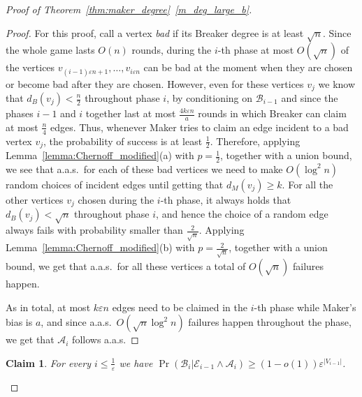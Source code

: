 \documentclass[11pt, a4paper]{article}
\numberwithin{equation}{section}
\numberwithin{figure}{section}
\newtheorem{claim}[theorem]{Claim}
\begin{document}
\begin{proof}[Proof of Theorem~\ref{thm:maker_degree}~\ref{m_deg_large_b}]
\begin{proof}
For this proof, call a vertex \textit{bad} if its Breaker degree is at least $\sqrt{n}$.
Since the whole game lasts $O(n)$ rounds,
during the $i$-th phase at most $O(\sqrt{n})$ of the vertices $v_{(i-1)\varepsilon n +1},\ldots,v_{i \varepsilon n}$ can be bad at the moment when they are chosen or become bad after they are chosen.
However, even for these vertices $v_j$ we know that
$d_B(v_j)< \frac{n}{2}$ throughout phase $i$,
by conditioning on $\mathcal{B}_{i-1}$ and since the phases
$i-1$ and $i$ together 
last at most $\frac{4k\varepsilon n}{a}$ rounds in which
Breaker can claim at most $\frac{n}{4}$ edges. Thus, whenever Maker tries to claim an edge incident to a bad vertex $v_j$,
the probability of success is at least $\frac{1}{2}$.
Therefore, applying Lemma~\ref{lemma:Chernoff_modified}(a)
with $p=\frac{1}{2}$, together with a union bound,
we see that a.a.s.~for each of these bad vertices we need to make $O(\log^2 n)$ random choices of incident edges until getting that $d_M(v_j)\geq k$. 
For all the other vertices $v_j$ chosen during the $i$-th phase, it always holds that $d_B(v_j)<\sqrt{n}$ throughout phase $i$, and hence the choice of a random edge always fails with probability smaller than 
$\frac{2}{\sqrt{n}}$.
Applying Lemma~\ref{lemma:Chernoff_modified}(b)
with $p=\frac{2}{\sqrt{n}}$,
together with a union bound, we get that a.a.s.~for all these vertices a total of
$O(\sqrt{n})$ failures happen.

As in total, at most $k\varepsilon n$ edges need to be claimed in
the $i$-th phase while Maker's bias is $a$,
and since a.a.s.~$O(\sqrt{n}\log^2 n)$ failures happen
throughout the phase, we get that $\mathcal{A}_i$
follows a.a.s.
\end{proof}


\begin{claim} \label{c:prob-bj-min-k}
For every $i\leq \frac{1}{\varepsilon}$ we have $\operatorname{Pr}(\mathcal{B}_i|\mathcal{E}_{i-1} \land \mathcal{A}_i) \geq (1-o(1)) \varepsilon^{|V_{i-1}|}$.
\end{claim}


\end{proof}
\end{document}
